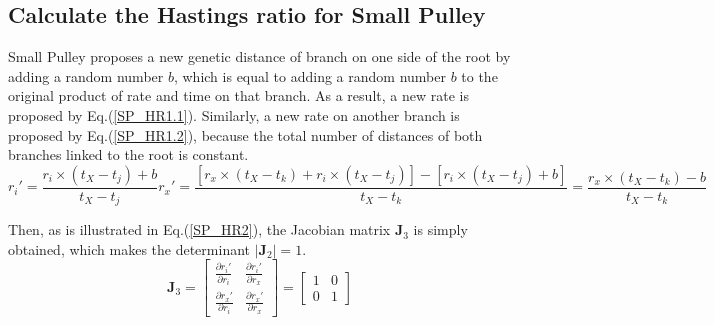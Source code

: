 \documentclass{bmcart}
\begin{document}
\begin{backmatter}
\subsection*{Calculate the Hastings ratio for Small Pulley}
Small Pulley proposes a new genetic distance of branch on one side of the root by adding a random number $b$, which is equal to adding a random number $b$ to the original product of rate and time on that branch. As a result, a new rate is proposed by Eq.(\ref{SP_HR1.1}). Similarly, a new rate on another branch is proposed by Eq.(\ref{SP_HR1.2}), because the total number of distances of both branches linked to the root is constant. 
\begin{subequations}\label{SP_HR1}
\begin{equation}\label{SP_HR1.1}
{r_i}' = \frac{{{r_i} \times ({t_X} - {t_j}) + b}}{{{t_X} - {t_j}}} 
\end{equation}  
\begin{equation}\label{SP_HR1.2}
{r_x}' = \frac{{[{r_x} \times ({t_X} - {t_k}) + {r_i} \times ({t_X} - {t_j})] - [{r_i} \times ({t_X} - {t_j}) + b]}}{{{t_X} - {t_k}}} = \frac{{{r_x} \times ({t_X} - {t_k}) - b}}{{{t_X} - {t_k}}}
\end{equation}  
\end{subequations}  

Then, as is illustrated in Eq.(\ref{SP_HR2}), the Jacobian matrix ${{\mathbf{J}}_3}$ is simply obtained, which makes the determinant $\left| {{{\mathbf{J}}_2}} \right| = 1$.
\begin{equation}\label{SP_HR2}
{{\mathbf{J}}_3} = \left[ {\begin{array}{*{20}{c}}
  {\frac{{\partial {r_i}'}}{{\partial {r_i}}}}&{\frac{{\partial {r_i}'}}{{\partial {r_x}}}} \\ 
  {\frac{{\partial {r_x}'}}{{\partial {r_i}}}}&{\frac{{\partial {r_x}'}}{{\partial {r_x}}}} 
\end{array}} \right] = \left[ {\begin{array}{*{20}{c}}
  1&0 \\ 
  0&1 
\end{array}} \right]
\end{equation}  

\end{backmatter}
\end{document}
